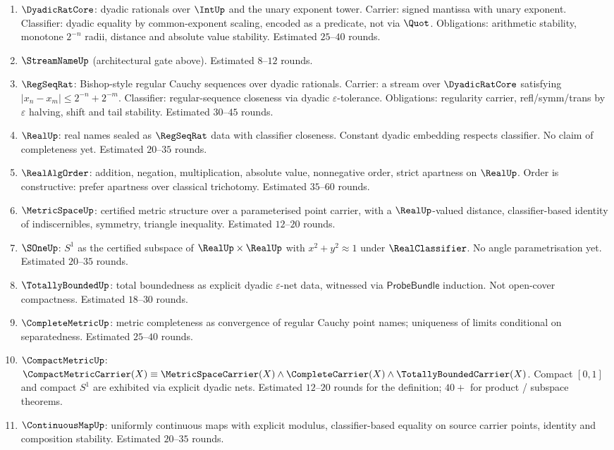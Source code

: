 \begin{enumerate}
  \item $\DyadicRatCore$: dyadic rationals over $\IntUp$ and the unary exponent tower. Carrier: signed mantissa with unary exponent. Classifier: dyadic equality by common-exponent scaling, encoded as a predicate, not via $\Quot$. Obligations: arithmetic stability, monotone $2^{-n}$ radii, distance and absolute value stability. Estimated $25$--$40$ rounds.
  \item $\StreamNameUp$ (architectural gate above). Estimated $8$--$12$ rounds.
  \item $\RegSeqRat$: Bishop-style regular Cauchy sequences over dyadic rationals. Carrier: a stream over $\DyadicRatCore$ satisfying $|x_n - x_m| \le 2^{-n} + 2^{-m}$. Classifier: regular-sequence closeness via dyadic $\varepsilon$-tolerance. Obligations: regularity carrier, refl/symm/trans by $\varepsilon$ halving, shift and tail stability. Estimated $30$--$45$ rounds.
  \item $\RealUp$: real names sealed as $\RegSeqRat$ data with classifier closeness. Constant dyadic embedding respects classifier. No claim of completeness yet. Estimated $20$--$35$ rounds.
  \item $\RealAlgOrder$: addition, negation, multiplication, absolute value, nonnegative order, strict apartness on $\RealUp$. Order is constructive: prefer apartness over classical trichotomy. Estimated $35$--$60$ rounds.
  \item $\MetricSpaceUp$: certified metric structure over a parameterised point carrier, with a $\RealUp$-valued distance, classifier-based identity of indiscernibles, symmetry, triangle inequality. Estimated $12$--$20$ rounds.
  \item $\SOneUp$: $S^1$ as the certified subspace of $\RealUp \times \RealUp$ with $x^2 + y^2 \approx 1$ under $\RealClassifier$. No angle parametrisation yet. Estimated $20$--$35$ rounds.
  \item $\TotallyBoundedUp$: total boundedness as explicit dyadic $\varepsilon$-net data, witnessed via $\mathsf{ProbeBundle}$ induction. Not open-cover compactness. Estimated $18$--$30$ rounds.
  \item $\CompleteMetricUp$: metric completeness as convergence of regular Cauchy point names; uniqueness of limits conditional on separatedness. Estimated $25$--$40$ rounds.
  \item $\CompactMetricUp$: $\CompactMetricCarrier(X) \equiv \MetricSpaceCarrier(X) \wedge \CompleteCarrier(X) \wedge \TotallyBoundedCarrier(X)$. Compact $[0,1]$ and compact $S^1$ are exhibited via explicit dyadic nets. Estimated $12$--$20$ rounds for the definition; $40+$ for product / subspace theorems.
  \item $\ContinuousMapUp$: uniformly continuous maps with explicit modulus, classifier-based equality on source carrier points, identity and composition stability. Estimated $20$--$35$ rounds.
\end{enumerate}

